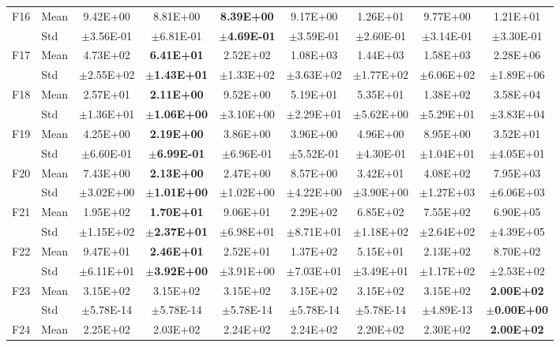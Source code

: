 \begin{table}[htbp]
{\begin{tabular}{clccccccc}
F16 & Mean & 9.42E+00 & 8.81E+00 & \textbf{8.39E+00} & 9.17E+00 & 1.26E+01 & 9.77E+00 & 1.21E+01 \\
 & Std & $\pm$3.56E-01 & $\pm$6.81E-01 & $\pm$\textbf{4.69E-01} & $\pm$3.59E-01 & $\pm$2.60E-01 & $\pm$3.14E-01 & $\pm$3.30E-01 \\
F17 & Mean & 4.73E+02 & \textbf{6.41E+01} & 2.52E+02 & 1.08E+03 & 1.44E+03 & 1.58E+03 & 2.28E+06 \\
 & Std & $\pm$2.55E+02 & $\pm$\textbf{1.43E+01} & $\pm$1.33E+02 & $\pm$3.63E+02 & $\pm$1.77E+02 & $\pm$6.06E+02 & $\pm$1.89E+06 \\
F18 & Mean & 2.57E+01 & \textbf{2.11E+00} & 9.52E+00 & 5.19E+01 & 5.35E+01 & 1.38E+02 & 3.58E+04 \\
 & Std & $\pm$1.36E+01 & $\pm$\textbf{1.06E+00} & $\pm$3.10E+00 & $\pm$2.29E+01 & $\pm$5.62E+00 & $\pm$5.29E+01 & $\pm$3.83E+04 \\
F19 & Mean & 4.25E+00 & \textbf{2.19E+00} & 3.86E+00 & 3.96E+00 & 4.96E+00 & 8.95E+00 & 3.52E+01 \\
 & Std & $\pm$6.60E-01 & $\pm$\textbf{6.99E-01} & $\pm$6.96E-01 & $\pm$5.52E-01 & $\pm$4.30E-01 & $\pm$1.04E+01 & $\pm$4.05E+01 \\
F20 & Mean & 7.43E+00 & \textbf{2.13E+00} & 2.47E+00 & 8.57E+00 & 3.42E+01 & 4.08E+02 & 7.95E+03 \\
 & Std & $\pm$3.02E+00 & $\pm$\textbf{1.01E+00} & $\pm$1.02E+00 & $\pm$4.22E+00 & $\pm$3.90E+00 & $\pm$1.27E+03 & $\pm$6.06E+03 \\
F21 & Mean & 1.95E+02 & \textbf{1.70E+01} & 9.06E+01 & 2.29E+02 & 6.85E+02 & 7.55E+02 & 6.90E+05 \\
 & Std & $\pm$1.15E+02 & $\pm$\textbf{2.37E+01} & $\pm$6.98E+01 & $\pm$8.71E+01 & $\pm$1.18E+02 & $\pm$2.64E+02 & $\pm$4.39E+05 \\
F22 & Mean & 9.47E+01 & \textbf{2.46E+01} & 2.52E+01 & 1.37E+02 & 5.15E+01 & 2.13E+02 & 8.70E+02 \\
 & Std & $\pm$6.11E+01 & $\pm$\textbf{3.92E+00} & $\pm$3.91E+00 & $\pm$7.03E+01 & $\pm$3.49E+01 & $\pm$1.17E+02 & $\pm$2.53E+02 \\
F23 & Mean & 3.15E+02 & 3.15E+02 & 3.15E+02 & 3.15E+02 & 3.15E+02 & 3.15E+02 & \textbf{2.00E+02} \\
 & Std & $\pm$5.78E-14 & $\pm$5.78E-14 & $\pm$5.78E-14 & $\pm$5.78E-14 & $\pm$5.78E-14 & $\pm$4.89E-13 & $\pm$\textbf{0.00E+00} \\
F24 & Mean & 2.25E+02 & 2.03E+02 & 2.24E+02 & 2.24E+02 & 2.20E+02 & 2.30E+02 & \textbf{2.00E+02} \\

\end{tabular}}
\end{table}
